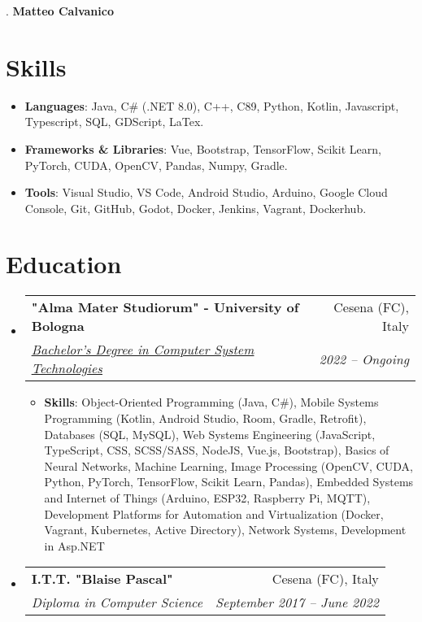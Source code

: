 \documentclass[letterpaper,11pt]{article}
\makeatletter
\newcommand{\resumeItem}[2]{
  \item\small{
    \textbf{#1}{: #2 \vspace{-2pt}}
  }
}
\newcommand{\resumeSubheading}[4]{
  \vspace{-1pt}\item
    \begin{tabular*}{0.97\textwidth}{l@{\extracolsep{\fill}}r}
      \textbf{#1} & #2 \\
      \textit{\small#3} & \textit{\small #4} \\
    \end{tabular*}\vspace{-5pt}
}
\newcommand{\resumeSubHeadingListStart}{\begin{itemize}[leftmargin=*]}
\newcommand{\resumeSubHeadingListEnd}{\end{itemize}}
\newcommand{\resumeItemListStart}{\begin{itemize}}
\newcommand{\resumeItemListEnd}{\end{itemize}\vspace{-5pt}}
\makeatother
\begin{document}
\setlength{\footskip}{5pt}.
\centering\textbf{\Large Matteo Calvanico} \\
  \vspace{0.25in}

\section{Skills}
\resumeSubHeadingListStart
  \item{
    \textbf{Languages}{: Java, C\# (.NET 8.0), C++, C89, Python, Kotlin, Javascript, Typescript, SQL, GDScript, LaTex.}
    \hfill
    }
  \item{
    \textbf{Frameworks \& Libraries}{: Vue, Bootstrap, TensorFlow, Scikit Learn, PyTorch, CUDA, OpenCV, Pandas, Numpy, Gradle.}
    \hfill
    }
  \item{
    \textbf{Tools}{: Visual Studio, VS Code, Android Studio, Arduino, Google Cloud Console, Git, GitHub, Godot, Docker, Jenkins, Vagrant, Dockerhub.}
    \hfill
    }
  \resumeSubHeadingListEnd

\section{Education}
  \resumeSubHeadingListStart
    \resumeSubheading
      {"Alma Mater Studiorum" - University of Bologna}{Cesena (FC), Italy}
      {\href{https://corsi.unibo.it/1cycle/ComputerSystemTechnologies}{\underline{Bachelor's Degree in Computer System Technologies}}}{2022 -- Ongoing}
      \resumeItemListStart
          \resumeItem{Skills}{Object-Oriented Programming (Java, C\#), Mobile Systems Programming (Kotlin, Android Studio, Room, Gradle, Retrofit), Databases (SQL, MySQL), Web Systems Engineering (JavaScript, TypeScript, CSS, SCSS/SASS, NodeJS, Vue.js, Bootstrap), Basics of Neural Networks, Machine Learning, Image Processing (OpenCV, CUDA, Python, PyTorch, TensorFlow, Scikit Learn, Pandas), 
          Embedded Systems and Internet of Things (Arduino, ESP32, Raspberry Pi, MQTT), Development Platforms for Automation and Virtualization (Docker, Vagrant, Kubernetes, Active Directory), Network Systems, Development in Asp.NET}
      \resumeItemListEnd
    \resumeSubheading
      {I.T.T. "Blaise Pascal"}{Cesena (FC), Italy}
      {Diploma in Computer Science}{September 2017 -- June 2022}
  \resumeSubHeadingListEnd
\end{document}
